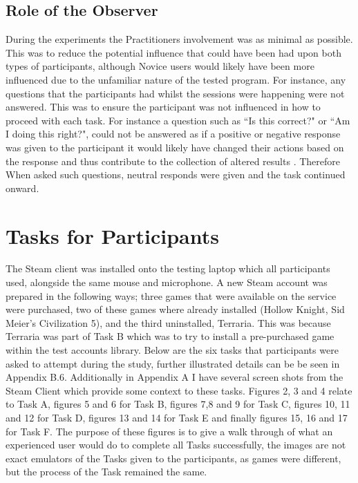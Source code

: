\subsection{Role of the Observer}
During the experiments the Practitioners involvement was as minimal as possible. This was to reduce the potential influence that could have been had upon both types of  participants, although Novice users would likely have been more influenced due to the unfamiliar nature of the tested program. For instance, any questions that the participants had whilst the sessions were happening were not answered. This was to ensure the participant was not influenced in how to proceed with each task. For instance a question such as ``Is this correct?" or ``Am I doing this right?", could not be answered as if a positive or negative response was given to the participant it would likely have changed their actions based on the response and thus contribute to the collection of altered results \citep{alhadreti2016thinking}. Therefore When asked such questions, neutral responds were given and the task continued onward.

\section{Tasks for Participants}
The Steam client was installed onto the testing laptop which all participants used, alongside the same mouse and microphone. A new Steam account was prepared in the following ways; three games that were available on the service were purchased, two of these games where already installed (Hollow Knight, Sid Meier's Civilization 5), and the third uninstalled, Terraria. This was because Terraria was part of Task B which was to try to install a pre-purchased game within the test accounts library. Below are the six tasks that participants were asked to attempt during the study, further illustrated details can be be seen in Appendix B.6. Additionally in Appendix A I have several screen shots from the Steam Client which provide some context to these tasks. Figures 2, 3 and 4 relate to Task A, figures 5 and 6 for Task B, figures 7,8 and 9 for Task C, figures 10, 11 and 12 for Task D, figures 13 and 14 for Task E and finally figures 15, 16 and 17 for Task F. The purpose of these figures is to give a walk through of what an experienced user would do to complete all Tasks successfully, the images are not exact emulators of the Tasks given to the participants, as games were different, but the process of the Task remained the same.

